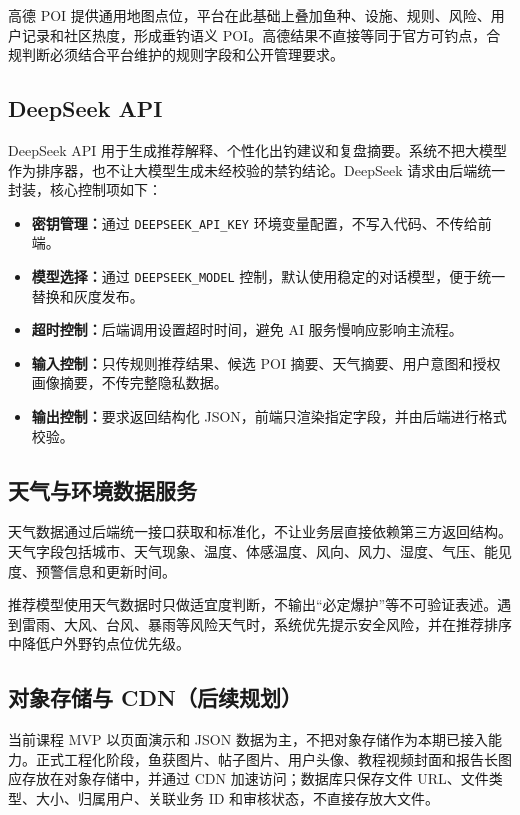 高德 POI 提供通用地图点位，平台在此基础上叠加鱼种、设施、规则、风险、用户记录和社区热度，形成垂钓语义 POI。高德结果不直接等同于官方可钓点，合规判断必须结合平台维护的规则字段和公开管理要求。

\subsection{DeepSeek API}

DeepSeek API 用于生成推荐解释、个性化出钓建议和复盘摘要。系统不把大模型作为排序器，也不让大模型生成未经校验的禁钓结论。DeepSeek 请求由后端统一封装，核心控制项如下：

\begin{itemize}
  \item \textbf{密钥管理：}通过 \texttt{DEEPSEEK\_API\_KEY} 环境变量配置，不写入代码、不传给前端。
  \item \textbf{模型选择：}通过 \texttt{DEEPSEEK\_MODEL} 控制，默认使用稳定的对话模型，便于统一替换和灰度发布。
  \item \textbf{超时控制：}后端调用设置超时时间，避免 AI 服务慢响应影响主流程。
  \item \textbf{输入控制：}只传规则推荐结果、候选 POI 摘要、天气摘要、用户意图和授权画像摘要，不传完整隐私数据。
  \item \textbf{输出控制：}要求返回结构化 JSON，前端只渲染指定字段，并由后端进行格式校验。
\end{itemize}

\subsection{天气与环境数据服务}

天气数据通过后端统一接口获取和标准化，不让业务层直接依赖第三方返回结构。天气字段包括城市、天气现象、温度、体感温度、风向、风力、湿度、气压、能见度、预警信息和更新时间。

推荐模型使用天气数据时只做适宜度判断，不输出“必定爆护”等不可验证表述。遇到雷雨、大风、台风、暴雨等风险天气时，系统优先提示安全风险，并在推荐排序中降低户外野钓点位优先级。

\subsection{对象存储与 CDN（后续规划）}

当前课程 MVP 以页面演示和 JSON 数据为主，不把对象存储作为本期已接入能力。正式工程化阶段，鱼获图片、帖子图片、用户头像、教程视频封面和报告长图应存放在对象存储中，并通过 CDN 加速访问；数据库只保存文件 URL、文件类型、大小、归属用户、关联业务 ID 和审核状态，不直接存放大文件。

